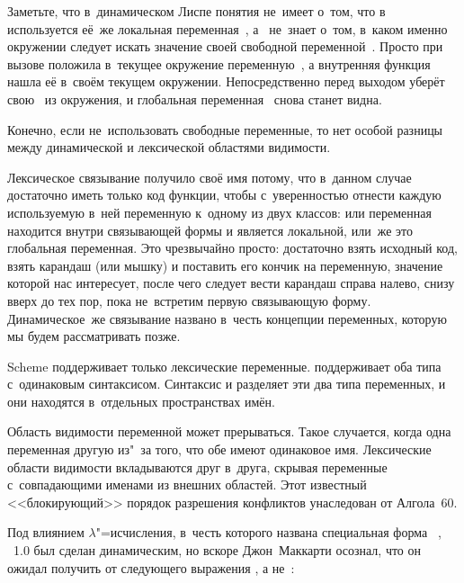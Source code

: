 Заметьте, что в~динамическом Лиспе  понятия не~имеет о~том, что
в~ используется её~же локальная переменная~, а~ не~знает
о~том, в~каком именно окружении следует искать значение своей свободной
переменной~. Просто  при вызове положила в~текущее окружение
переменную~, а внутренняя функция  нашла её в~своём
текущем окружении. Непосредственно перед выходом  уберёт свою~ из
окружения, и глобальная переменная~ снова станет видна.

Конечно, если не~использовать свободные переменные, то нет особой разницы между
динамической и лексической областями видимости.

Лексическое связывание получило своё имя потому, что в~данном случае достаточно
иметь только код функции, чтобы с~уверенностью отнести каждую используемую в~ней
переменную к~одному из двух классов: или переменная находится внутри связывающей
формы и является локальной, или~же это глобальная переменная. Это чрезвычайно
просто: достаточно взять исходный код, взять карандаш (или мышку) и поставить
его кончик на переменную, значение которой нас интересует, после чего следует
вести карандаш справа налево, снизу вверх до тех пор, пока не~встретим первую
связывающую форму. Динамическое~же связывание названо в~честь концепции
 переменных, которую мы будем рассматривать
позже. 

Scheme поддерживает только лексические переменные. {\CommonLisp} поддерживает
оба типа с~одинаковым синтаксисом. Синтаксис {\EuLisp} и {\ISLisp} разделяет эти
два типа переменных, и они находятся в~отдельных пространствах имён. 

Область видимости переменной может прерываться. Такое случается, когда одна
переменная  другую из"~за того, что обе имеют одинаковое имя.
Лексические области видимости вкладываются друг в~друга, скрывая переменные
с~совпадающими именами из внешних областей. Этот известный <<блокирующий>>
порядок разрешения конфликтов унаследован от Алгола~60.

Под влиянием $\lambda$"=исчисления, в~честь которого названа специальная
форма ~\cite{per79}, \LISP~1.0 был сделан динамическим, но вскоре
Джон~Маккарти осознал, что он ожидал получить от следующего выражения
, а не~:

